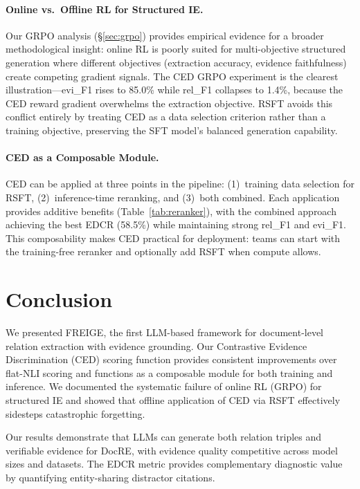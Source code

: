 \documentclass[11pt,a4paper]{article}
\newcommand{\method}{FREIGE}
\newcommand{\ced}{CED}
\begin{document}
\paragraph{Online vs.\ Offline RL for Structured IE.}
Our GRPO analysis (\S\ref{sec:grpo}) provides empirical evidence for a broader methodological insight: online RL is poorly suited for multi-objective structured generation where different objectives (extraction accuracy, evidence faithfulness) create competing gradient signals. The CED GRPO experiment is the clearest illustration---evi\_F1 rises to 85.0\% while rel\_F1 collapses to 1.4\%, because the CED reward gradient overwhelms the extraction objective. RSFT avoids this conflict entirely by treating CED as a data selection criterion rather than a training objective, preserving the SFT model's balanced generation capability.

\paragraph{CED as a Composable Module.}
CED can be applied at three points in the pipeline: (1)~training data selection for RSFT, (2)~inference-time reranking, and (3)~both combined. Each application provides additive benefits (Table~\ref{tab:reranker}), with the combined approach achieving the best EDCR (58.5\%) while maintaining strong rel\_F1 and evi\_F1. This composability makes CED practical for deployment: teams can start with the training-free reranker and optionally add RSFT when compute allows.

\section{Conclusion}

We presented \method{}, the first LLM-based framework for document-level relation extraction with evidence grounding. Our Contrastive Evidence Discrimination (\ced{}) scoring function provides consistent improvements over flat-NLI scoring and functions as a composable module for both training and inference. We documented the systematic failure of online RL (GRPO) for structured IE and showed that offline application of \ced{} via RSFT effectively sidesteps catastrophic forgetting.

Our results demonstrate that LLMs can generate both relation triples and verifiable evidence for DocRE, with evidence quality competitive across model sizes and datasets. The EDCR metric provides complementary diagnostic value by quantifying entity-sharing distractor citations.
\end{document}
